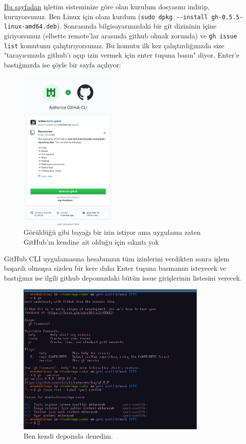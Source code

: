 \documentclass[11pt]{article}
\begin{document}
\href{https://cli.github.com/}{Bu sayfadan} işletim sisteminize göre olan kurulum dosyasını indirip,
kuruyorsunuz. Ben Linux için olanı kurdum (\texttt{sudo dpkg -{}-install
	gh-0.5.5-linux-amd64.deb}). Sonrasında bilgisayarınızdaki bir git dizininin
içine giriyorsunuz (elbette remote'lar arasında github olmak zorunda) ve \texttt{gh
	issue list} komutunu çalıştırıyorsunuz. Bu komutu ilk kez çalıştırdığınızda
size "tarayıcınızda github'ı açıp izin vermek için enter tuşuna basın" diyor.
Enter'e bastığınızda ise şöyle bir sayfa açılıyor:

\begin{figure}[htbp]
\centering
\includegraphics[height=8cm]{gorseller/github-cli-izin.png}
\caption{Görüldüğü gibi bayağı bir izin istiyor ama uygulama zaten GitHub'ın kendine ait olduğu için sıkıntı yok}
\end{figure}
\newpage

GitHub CLI uygulamasına hesabınızın tüm izinlerini verdikten sonra işlem
başarılı olmuşsa sizden bir kere daha Enter tuşuna basmanızı isteyecek ve
bastığınız ise ilgili github deponuzdaki bütün issue girişlerinin listesini
verecek.

\begin{figure}[htbp]
\centering
\includegraphics[height=7.5cm]{gorseller/github-cli-demo.png}
\caption{Ben kendi depomda denedim.}
\end{figure}
\newpage
\end{document}
